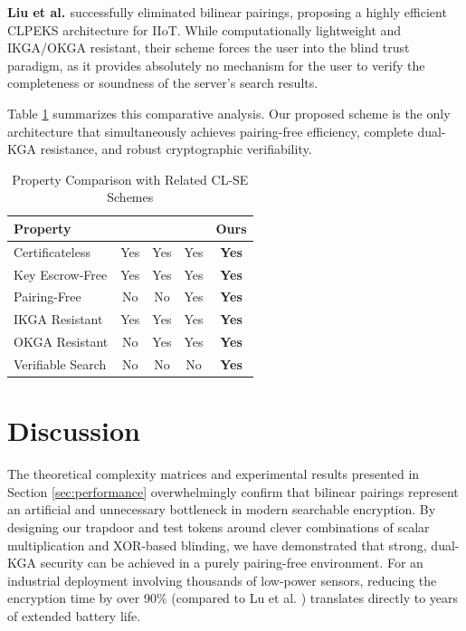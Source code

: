 \documentclass[10pt,journal,compsoc]{IEEEtran}
\begin{document}
\textbf{Liu et al. \cite{liu2023pairing}} successfully eliminated bilinear pairings, proposing a highly efficient CLPEKS architecture for IIoT. While computationally lightweight and IKGA/OKGA resistant, their scheme forces the user into the blind trust paradigm, as it provides absolutely no mechanism for the user to verify the completeness or soundness of the server's search results.

Table \ref{tab:comparison} summarizes this comparative analysis. Our proposed scheme is the only architecture that simultaneously achieves pairing-free efficiency, complete dual-KGA resistance, and robust cryptographic verifiability.

\begin{table}[htbp]
\centering
\caption{Property Comparison with Related CL-SE Schemes}\label{tab:comparison}
\begin{tabular}{lcccc}
\toprule
\textbf{Property} & \textbf{\cite{elhabob2020efficient}} & \textbf{\cite{lu2023certificateless}} & \textbf{\cite{liu2023pairing}} & \textbf{Ours} \\
\midrule
Certificateless & Yes & Yes & Yes & \textbf{Yes} \\
Key Escrow-Free & Yes & Yes & Yes & \textbf{Yes} \\
Pairing-Free & No & No & Yes & \textbf{Yes} \\
IKGA Resistant & Yes & Yes & Yes & \textbf{Yes} \\
OKGA Resistant & No & Yes & Yes & \textbf{Yes} \\
Verifiable Search & No & No & No & \textbf{Yes} \\
\bottomrule
\end{tabular}
\end{table}

\section{Discussion}\label{sec:discussion}
The theoretical complexity matrices and experimental results presented in Section \ref{sec:performance} overwhelmingly confirm that bilinear pairings represent an artificial and unnecessary bottleneck in modern searchable encryption. By designing our trapdoor and test tokens around clever combinations of scalar multiplication and XOR-based blinding, we have demonstrated that strong, dual-KGA security can be achieved in a purely pairing-free environment. For an industrial deployment involving thousands of low-power sensors, reducing the encryption time by over 90\% (compared to Lu et al. \cite{lu2023certificateless}) translates directly to years of extended battery life.
\end{document}
